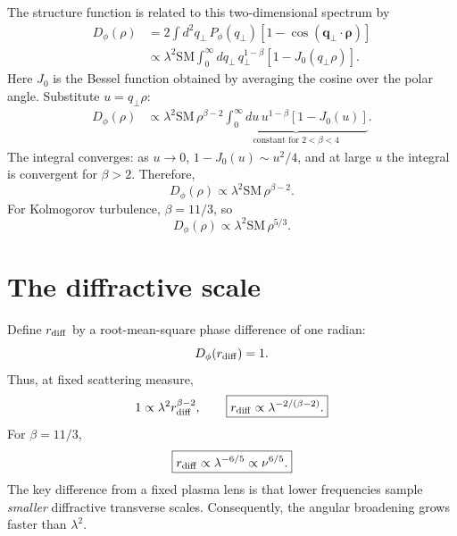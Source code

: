 The structure function is related to this two-dimensional spectrum by
\begin{align}
D_\phi(\rho)
&=2\int d^2q_\perp\,P_\phi(q_\perp)
\left[1-\cos(\mathbf q_\perp\cdot\boldsymbol\rho)\right]\\
&\propto \lambda^2\mathrm{SM}\int_0^\infty dq_\perp\,q_\perp^{1-\beta}\left[1-J_0(q_\perp\rho)\right].
\end{align}
Here $J_0$ is the Bessel function obtained by averaging the cosine over the polar angle. Substitute $u=q_\perp\rho$:
\begin{align}
D_\phi(\rho)
&\propto \lambda^2\mathrm{SM}\,\rho^{\beta-2}
\underbrace{\int_0^\infty du\,u^{1-\beta}[1-J_0(u)]}_{\text{constant for }2<\beta<4}.
\end{align}
The integral converges: as $u\to0$, $1-J_0(u)\sim u^2/4$, and at large $u$ the integral is convergent for $\beta>2$. Therefore,
\begin{equation}
\boxed{D_\phi(\rho)\propto\lambda^2\mathrm{SM}\,\rho^{\beta-2}.}
\end{equation}
For Kolmogorov turbulence, $\beta=11/3$, so
\begin{equation}
\boxed{D_\phi(\rho)\propto\lambda^2\mathrm{SM}\,\rho^{5/3}.}
\end{equation}

\section{The diffractive scale}
Define $r_{\rm diff}$ by a root-mean-square phase difference of one radian:
\begin{equation}
D_\phi(r_{\rm diff})=1.
\end{equation}
Thus, at fixed scattering measure,
\begin{equation}
1\propto\lambda^2r_{\rm diff}^{\beta-2},
\qquad
\boxed{r_{\rm diff}\propto\lambda^{-2/(\beta-2)}.}
\end{equation}
For $\beta=11/3$,
\begin{equation}
\boxed{r_{\rm diff}\propto\lambda^{-6/5}\propto\nu^{6/5}.}
\end{equation}
The key difference from a fixed plasma lens is that lower frequencies sample \emph{smaller} diffractive transverse scales. Consequently, the angular broadening grows faster than $\lambda^2$.

